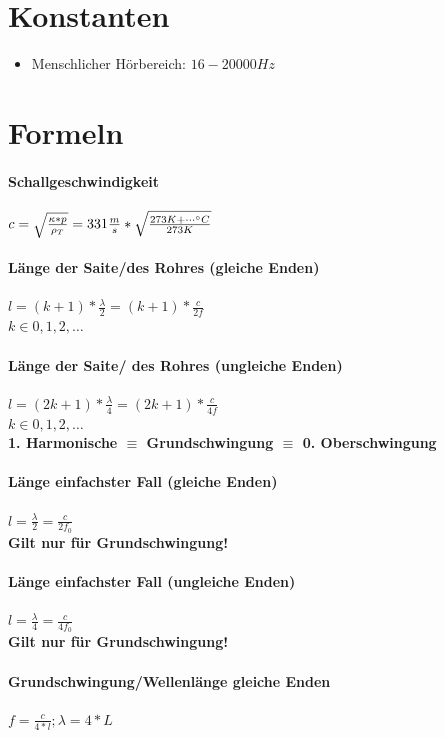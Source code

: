 \documentclass[12pt, a4paper]{scrreprt}
\begin{document}
\section{Konstanten}

\begin{itemize}
\item Menschlicher Hörbereich: \(16 - 20000 Hz\)
\end{itemize}

\section{Formeln}
\paragraph{Schallgeschwindigkeit} \dotfill \(c = \sqrt{\frac{\kappa * p}{\rho_T}} = 331\frac{m}{s} * \sqrt{\frac{273K + \cdots \degree C}{273K}}\)
\paragraph{Länge der Saite/des Rohres (gleiche Enden)} \dotfill \(l = (k + 1) * \frac{\lambda}{2} = (k + 1) * \frac{c}{2f}\)\\
\myhspace \textbf{\(k \in 0, 1, 2, \dots\)}
\paragraph{Länge der Saite/ des Rohres (ungleiche Enden)} \dotfill \(l = (2k+1) * \frac{\lambda}{4} = (2k+1) * \frac{c}{4f}\)\\
\myhspace \textbf{\(k \in 0, 1, 2, \dots\)}\\
\myhspace \textbf{\glqq{} 1. Harmonische\grqq{} \(\equiv\) \glqq{} Grundschwingung \grqq{} \(\equiv\) \glqq{} 0. Oberschwingung\grqq{}}
\paragraph{Länge einfachster Fall (gleiche Enden)} \dotfill \(l = \frac{\lambda}{2} = \frac{c}{2f_0}\)\\
\myhspace \textbf{Gilt nur für Grundschwingung!}
\paragraph{Länge einfachster Fall (ungleiche Enden)} \dotfill \(l = \frac{\lambda}{4} = \frac{c}{4f_0}\)\\
\myhspace \textbf{Gilt nur für Grundschwingung!}
\paragraph{Grundschwingung/Wellenlänge gleiche Enden} \dotfill \(f = \frac{c}{4*l} ; \lambda = 4 * L\)
\end{document}
